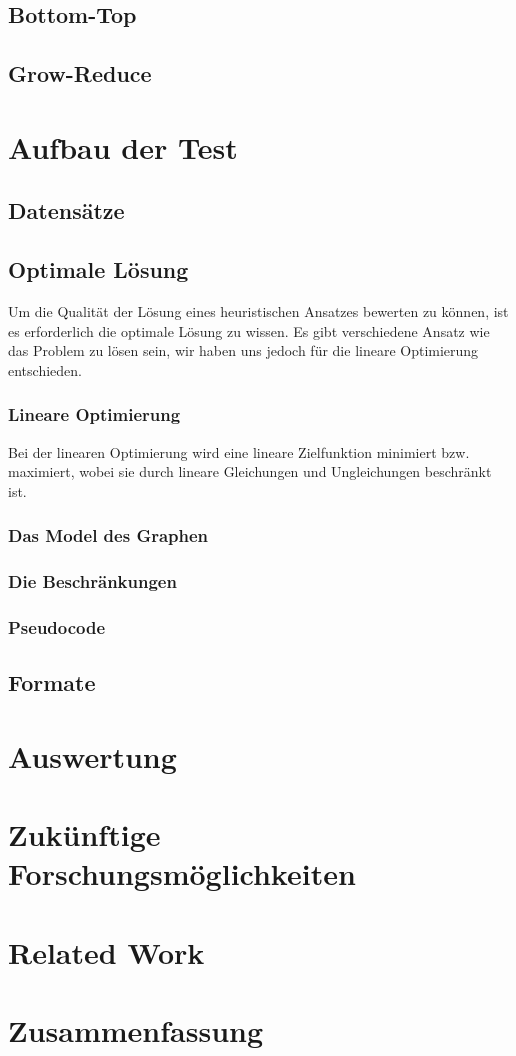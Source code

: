 \documentclass[12pt,a4paper,onecolumn,oneside,titlepage]{article}
\begin{document}
\subsection{Bottom-Top}
\subsection{Grow-Reduce}

\section{Aufbau der Test}
\subsection{Datensätze}
\subsection{Optimale Lösung}
Um die Qualität der Lösung eines heuristischen Ansatzes bewerten zu können, ist es erforderlich die optimale Lösung zu wissen. Es gibt verschiedene Ansatz wie das Problem zu lösen sein, wir haben uns jedoch für die lineare Optimierung entschieden.
\subsubsection{Lineare Optimierung}
Bei der linearen Optimierung wird eine lineare Zielfunktion minimiert bzw. maximiert, wobei sie durch lineare Gleichungen und Ungleichungen beschränkt ist.
\subsubsection{Das Model des Graphen}

\subsubsection{Die Beschränkungen}
\subsubsection{Pseudocode}


\subsection{Formate}

\section{Auswertung}
\section{Zukünftige Forschungsmöglichkeiten}
\section{Related Work}
\section{Zusammenfassung}
\end{document}
